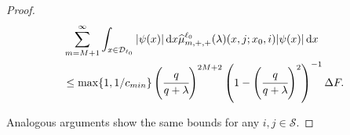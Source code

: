 \begin{proof}
        
        \begin{align}
	         & \sum_{m=M+1}^\infty \int_{x\in\mathcal{D}_{\ell_0}} |\psi(x)|\, \mathrm{d} x \widehat \mu^{\ell_0}_{m,+,+}(\lambda)(x,j;x_0,i) |\psi(x)|\, \mathrm{d} x \nonumber
	        \\&\leq \max\{1, 1/c_{min}\}\left(\cfrac{q}{q+\lambda}\right)^{2M+2} \left(1-\left(\cfrac{q}{q+\lambda}\right)^2\right)^{-1}\Delta F.
        \end{align}
        
	Analogous arguments show the same bounds for any \(i,j\in\mathcal S\). 
\end{proof}


